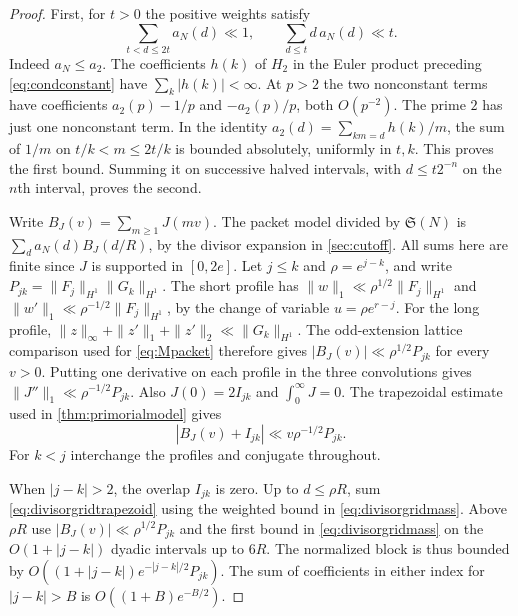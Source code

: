 \documentclass[11pt,a4paper]{article}
\numberwithin{equation}{section}
\newcommand{\SSS}{\mathfrak S}
\begin{document}
\begin{proof}
First, for $t>0$ the positive weights satisfy
\begin{equation}
 \sum_{t<d\le 2t}a_N(d)\ll 1,
 \qquad \sum_{d\le t}d\,a_N(d)\ll t .
 \label{eq:divisorgridmass}
\end{equation}
Indeed $a_N\le a_2$. The coefficients $h(k)$ of $H_2$ in the
Euler product preceding \cref{eq:condconstant} have
$\sum_k|h(k)|<\infty$. At $p>2$ the two nonconstant terms have
coefficients $a_2(p)-1/p$ and $-a_2(p)/p$, both $O(p^{-2})$.
The prime $2$ has just one nonconstant term. In the identity
$a_2(d)=\sum_{km=d}h(k)/m$, the sum of $1/m$ on
$t/k<m\le 2t/k$ is bounded absolutely, uniformly in $t,k$.
This proves the first bound. Summing it on successive halved
intervals, with $d\le t2^{-n}$ on the $n$th interval, proves the second.

Write $B_J(v)=\sum_{m\ge1}J(mv)$. The packet model divided by
$\SSS(N)$ is $\sum_d a_N(d)B_J(d/R)$, by the divisor expansion
in \cref{sec:cutoff}. All sums here are finite since $J$ is supported
in $[0,2e]$. Let $j\le k$ and $\rho=e^{j-k}$, and write
$P_{jk}=\|F_j\|_{H^1}\|G_k\|_{H^1}$. The short profile has
$\|w\|_1\ll \rho^{1/2}\|F_j\|_{H^1}$ and
$\|w'\|_1\ll\rho^{-1/2}\|F_j\|_{H^1}$, by the change of variable
$u=\rho e^{r-j}$. For the long profile,
$\|z\|_\infty+\|z'\|_1+\|z'\|_2\ll\|G_k\|_{H^1}$.
The odd-extension lattice comparison used for \cref{eq:Mpacket}
therefore gives $|B_J(v)|\ll\rho^{1/2}P_{jk}$ for every $v>0$.
Putting one derivative on each profile in the three convolutions
gives $\|J''\|_1\ll \rho^{-1/2}P_{jk}$. Also
$J(0)=2I_{jk}$ and $\int_0^\infty J=0$. The trapezoidal estimate
used in \cref{thm:primorialmodel} gives
\begin{equation}
 |B_J(v)+I_{jk}|\ll v\rho^{-1/2}P_{jk} .
 \label{eq:divisorgridtrapezoid}
\end{equation}
For $k<j$ interchange the profiles and conjugate throughout.

When $|j-k|>2$, the overlap $I_{jk}$ is zero. Up to $d\le\rho R$,
sum \cref{eq:divisorgridtrapezoid} using the weighted bound
in \cref{eq:divisorgridmass}. Above $\rho R$ use
$|B_J(v)|\ll\rho^{1/2}P_{jk}$ and the first bound in
\cref{eq:divisorgridmass} on the $O(1+|j-k|)$ dyadic intervals
up to $6R$. The normalized block is thus bounded by
$O((1+|j-k|)e^{-|j-k|/2}P_{jk})$. The sum of coefficients
in either index for $|j-k|>B$ is $O((1+B)e^{-B/2})$.


\end{proof}
\end{document}
